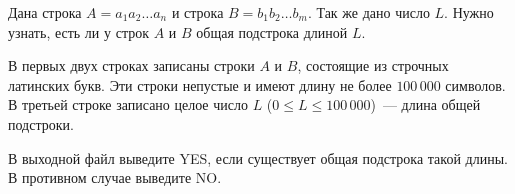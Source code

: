 Дана строка $A = a_1a_2 \ldots a_n$ и строка $B = b_1b_2 \ldots b_m$. Так же дано число $L$. Нужно узнать, есть ли у строк $A$ и $B$ общая подстрока длиной $L$.
 
\InputFile

В первых двух строках записаны строки $A$ и $B$, состоящие из строчных латинских букв.
Эти строки непустые и имеют длину не более $100\,000$ символов. В третьей
строке записано целое число $L$ ($0 \le L \le 100\,000$)~---
 длина общей подстроки\-.

\OutputFile
В выходной файл выведите YES, если существует общая подстрока такой длины. В противном случае выведите NO.
